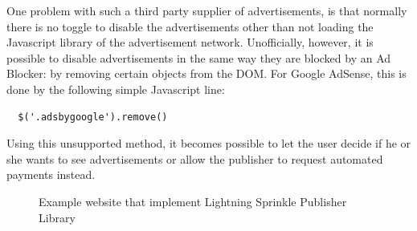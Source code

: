 One problem with such a third party supplier of advertisements, is that normally there is no toggle to disable the advertisements other than not loading the Javascript library of the advertisement network. Unofficially, however, it is possible to disable advertisements in the same way they are blocked by an Ad Blocker: by removing certain objects from the DOM. For Google AdSense, this is done by the following simple Javascript line:


\lstset{language=Javascript}
\lstset{frame=lines}
\lstset{basicstyle=\footnotesize}
\begin{lstlisting}
  $('.adsbygoogle').remove()
\end{lstlisting}

Using this unsupported method, it becomes possible to let the user decide if he or she wants to see advertisements or allow the publisher to request automated payments instead.

\begin{figure}[h!]
  \setlength{\fboxsep}{0pt}%
  \caption{Example website that implement Lightning Sprinkle Publisher Library}
\end{figure}
